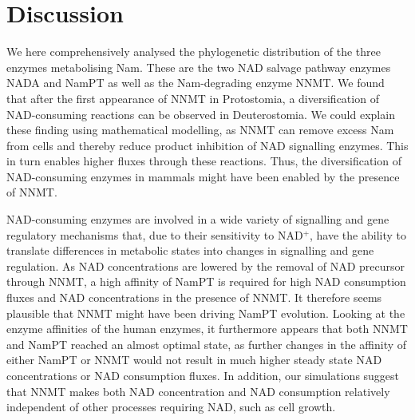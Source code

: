 
\section{Discussion}

We here comprehensively analysed the phylogenetic distribution of the three enzymes metabolising  Nam. These are the two NAD salvage pathway enzymes NADA and NamPT as well as the Nam-degrading enzyme NNMT. We found that after the first appearance of NNMT in Protostomia, a diversification of NAD-consuming reactions  can be observed in Deuterostomia. We could explain these finding using mathematical modelling, as NNMT can remove excess Nam from cells and thereby reduce product inhibition of NAD signalling enzymes. This in turn enables higher fluxes through these reactions. Thus, the diversification of NAD-consuming enzymes in mammals might have been enabled by the presence of NNMT.

NAD-consuming enzymes are involved in a wide variety of signalling and gene regulatory mechanisms that, due to their sensitivity to NAD$^{+}$, have the ability to translate differences in metabolic states into changes in signalling and gene regulation. As NAD concentrations are lowered by the removal of NAD precursor through  NNMT,  a high affinity of NamPT is required for high NAD consumption fluxes and NAD concentrations in the presence of NNMT. It therefore seems plausible that NNMT might have been driving NamPT evolution. Looking at the enzyme affinities of the human enzymes, it furthermore appears that both NNMT and NamPT reached an almost optimal state, as further changes in the affinity of either NamPT or NNMT would not result in much higher steady state NAD concentrations or NAD consumption fluxes. In addition, our simulations suggest that NNMT makes both NAD concentration and NAD consumption relatively independent of other processes requiring NAD, such as cell growth.

